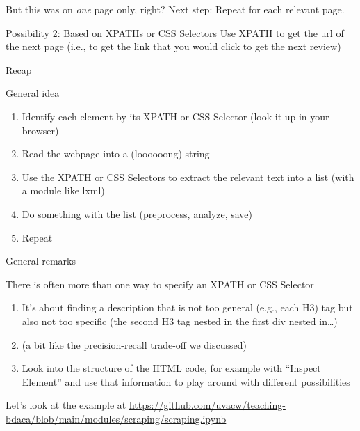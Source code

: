 \begin{frame}[fragile]{But this was on \emph{one} page only, right?}
  Next step: Repeat for each relevant page.
  
  \begin{block}{Possibility 2: Based on XPATHs or CSS Selectors}
    Use XPATH to get the url of the next page (i.e., to get the link that you would click to get the next review)
  \end{block}
	
\end{frame}


\begin{frame}{Recap}
\begin{block}{General idea}
\begin{enumerate}
\item Identify each element by its XPATH or CSS Selector (look it up in your browser) 
\item Read the webpage into a (loooooong) string
\item Use the XPATH  or CSS Selectors to extract the relevant text into a list (with a module like lxml)
\item Do something with the list (preprocess, analyze, save)
\item Repeat
\end{enumerate}
\end{block}
\end{frame}


\begin{frame}{General remarks}
  \begin{block}{There is often more than one way to specify an XPATH or CSS Selector}
    \begin{enumerate}
    \item It's about finding a description that is not too general (e.g., each H3) tag but also not too specific (the second H3 tag nested in the first div nested in\ldots)
      \item (a bit like the precision-recall trade-off we discussed)
      \item Look into the structure of the HTML code, for example with ``Inspect Element'' and use that information to play around with different possibilities
    \end{enumerate}
  \end{block}
\end{frame}



\begin{frame}[standout]
Let's look at the example at \url{https://github.com/uvacw/teaching-bdaca/blob/main/modules/scraping/scraping.ipynb}
\end{frame}


